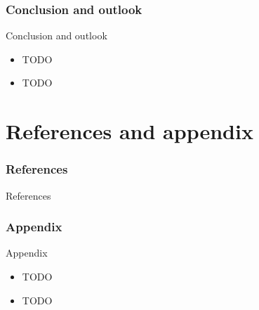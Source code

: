 \documentclass[xcolor=dvipsnames]{beamer}
\begin{document}
\section{Conclusion and outlook}

\begin{frame}{Conclusion and outlook}
	\begin{itemize}
		\item TODO
		\item TODO
	\end{itemize}
\end{frame}




\part{References and appendix}


\section{References}

\begin{frame}[allowframebreaks, t]{References}
	\footnotesize
	
	
\end{frame}


\section{Appendix}

\begin{frame}[allowframebreaks]{Appendix}
	\begin{itemize}
		\item TODO
		\item TODO
	\end{itemize}
\end{frame}
\end{document}
